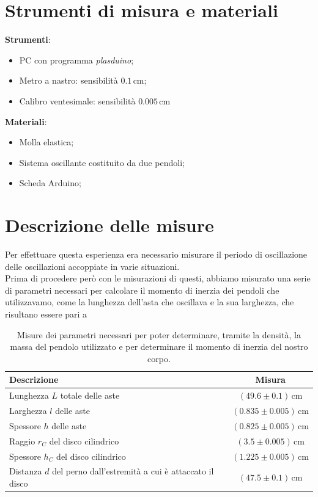 \documentclass{article}
\begin{document}
\section{Strumenti di misura e materiali}

\textbf{Strumenti}:
\begin{itemize}
	\item PC con programma \emph{plasduino};
	\item Metro a nastro: sensibilità $0.1 \, \si{\centi\meter}$;
	\item Calibro ventesimale: sensibilità $0.005 \, \si{\centi\meter}$
\end{itemize}
\textbf{Materiali}:
\begin{itemize}
	\item Molla elastica;
	\item Sistema oscillante costituito da due pendoli;
	\item Scheda Arduino;
\end{itemize}

\section{Descrizione delle misure}

Per effettuare questa esperienza era necessario misurare il periodo di oscillazione delle oscillazioni accoppiate in varie situazioni. \\
Prima di procedere però con le misurazioni di questi, abbiamo misurato una serie di parametri necessari per calcolare il momento di inerzia dei pendoli che utilizzavamo, come la lunghezza dell'asta che oscillava e la sua larghezza, che risultano essere pari a
\begin{table}[H]
\centering
\begin{tabular}{l c}
	Descrizione & Misura \\ \midrule	
	Lunghezza $L$ totale delle aste & $(49.6 \pm 0.1) \, \si{\centi\meter}$ \\ \midrule
	Larghezza $l$ delle aste & $(0.835 \pm 0.005) \, \si{\centi\meter}$ \\ \midrule
	Spessore $h$ delle aste & $(0.825 \pm 0.005) \, \si{\centi\meter}$ \\ \midrule
	Raggio $r_C$ del disco cilindrico & $(3.5 \pm 0.005) \, \si{\centi\meter}$ \\ \midrule
	Spessore $h_C$ del disco cilindrico & $(1.225 \pm 0.005) \, \si{\centi\meter}$  \\ \midrule
	Distanza $d$ del perno dall'estremità a cui è attaccato il disco & $(47.5 \pm 0.1) \, \si{\centi\meter}$ \\
	\bottomrule
\end{tabular}
\caption{Misure dei parametri necessari per poter determinare, tramite la densità, la massa del pendolo utilizzato e per determinare il momento di inerzia del nostro corpo.}
\end{table}
\end{document}
